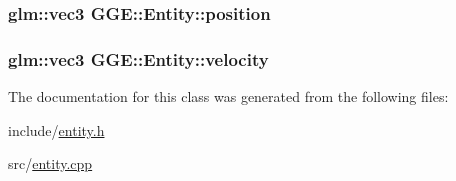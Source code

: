 \hypertarget{class_g_g_e_1_1_entity_a38a9fa01bfaf37ca415181ba6a179d3f}{
\subsubsection[{position}]{\setlength{\rightskip}{0pt plus 5cm}glm\+::vec3 G\+G\+E\+::\+Entity\+::position\hspace{0.3cm}{\ttfamily [protected]}}}\label{class_g_g_e_1_1_entity_a38a9fa01bfaf37ca415181ba6a179d3f}
\hypertarget{class_g_g_e_1_1_entity_a4fd6a0bab72b12da601c34e7f3fe4620}{
\subsubsection[{velocity}]{\setlength{\rightskip}{0pt plus 5cm}glm\+::vec3 G\+G\+E\+::\+Entity\+::velocity\hspace{0.3cm}{\ttfamily [protected]}}}\label{class_g_g_e_1_1_entity_a4fd6a0bab72b12da601c34e7f3fe4620}


The documentation for this class was generated from the following files\+:\begin{DoxyCompactItemize}
\item 
include/\hyperlink{entity_8h}{entity.\+h}\item 
src/\hyperlink{entity_8cpp}{entity.\+cpp}\end{DoxyCompactItemize}
